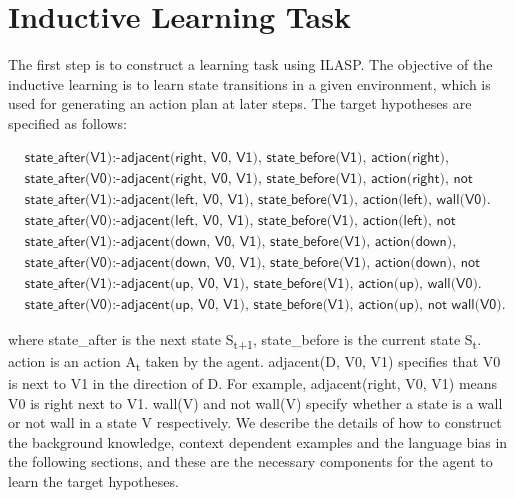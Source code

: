 \section{Inductive Learning Task}
\label{sec:inductive_learning_task}
The first step is to construct a learning task using ILASP. The objective of the inductive learning is to learn state transitions in a given environment, which is used for generating an action plan at later steps.
The target hypotheses are specified as follows:

\begin{equation}
\begin{split}
&\textsf{state\_after(V1):-adjacent(right, V0, V1), state\_before(V1), action(right), wall(V0).}\\
&\textsf{state\_after(V0):-adjacent(right, V0, V1), state\_before(V1), action(right), not wall(V0).}\\
&\textsf{state\_after(V1):-adjacent(left, V0, V1), state\_before(V1), action(left), wall(V0).}\\
&\textsf{state\_after(V0):-adjacent(left, V0, V1), state\_before(V1), action(left), not wall(V0).}\\
&\textsf{state\_after(V1):-adjacent(down, V0, V1), state\_before(V1), action(down), wall(V0).}\\
&\textsf{state\_after(V0):-adjacent(down, V0, V1), state\_before(V1), action(down), not wall(V0).}\\
&\textsf{state\_after(V1):-adjacent(up, V0, V1), state\_before(V1),  action(up), wall(V0).}\\
&\textsf{state\_after(V0):-adjacent(up, V0, V1), state\_before(V1), action(up), not wall(V0).}
\end{split}
\label{target_hypothesis}
\end{equation}

where \textsf{state\_after} is the next state S\textsubscript{t+1}, \textsf{state\_before} is the current state S\textsubscript{t}. \textsf{action} is an action A\textsubscript{t} taken by the agent.
\textsf{adjacent(D, V0, V1)} specifies that V0 is next to V1 in the direction of D. For example, \textsf{adjacent(right, V0, V1)} means V0 is right next to V1. 
\textsf{wall(V)} and \textsf{not wall(V)} specify whether a state is a wall or not wall in a state V respectively.
We describe the details of how to construct the background knowledge, context dependent examples and the language bias in the following sections, and these are the necessary components for the agent to learn the target hypotheses.

